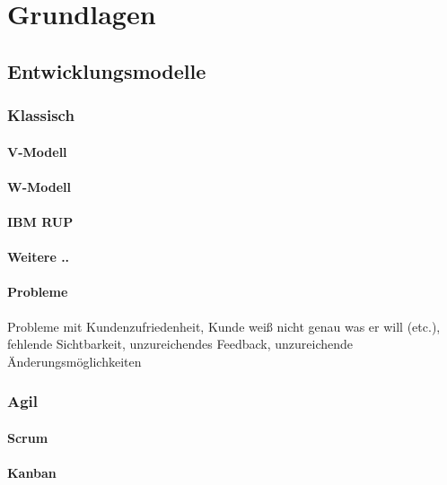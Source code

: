 \chapter{Grundlagen}

\section{Entwicklungsmodelle}

\subsection{Klassisch}

\subsubsection{V-Modell}

\subsubsection{W-Modell}

\subsubsection{IBM RUP}

\subsubsection{Weitere ..}

\subsubsection{Probleme}

Probleme mit Kundenzufriedenheit, Kunde weiß nicht genau was er will (etc.),
fehlende Sichtbarkeit, unzureichendes Feedback, unzureichende Änderungsmöglichkeiten

\subsection{Agil}

\subsubsection{Scrum}

\subsubsection{Kanban}

